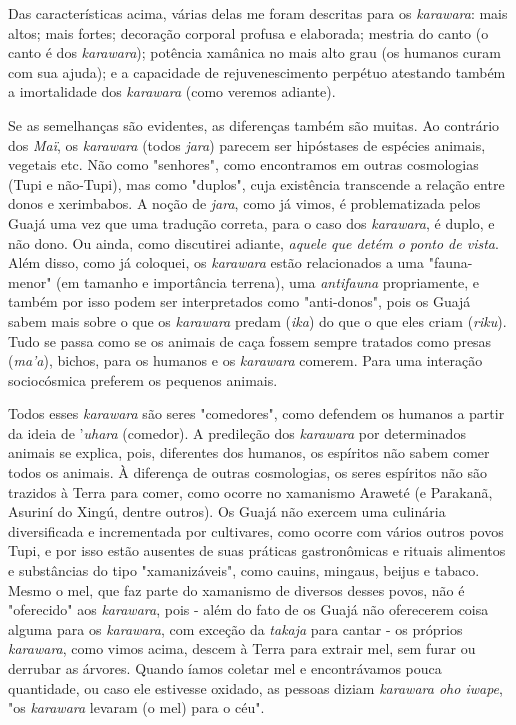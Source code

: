 Das características acima, várias delas me foram descritas para os
\emph{karawara}: mais altos; mais fortes; decoração corporal profusa e
elaborada; mestria do canto (o canto é dos \emph{karawara}); potência
xamânica no mais alto grau (os humanos curam com sua ajuda); e a
capacidade de rejuvenescimento perpétuo atestando também a imortalidade
dos \emph{karawara} (como veremos adiante).

Se as semelhanças são evidentes, as diferenças também são muitas. Ao
contrário dos \emph{Maï}, os \emph{karawara} (todos \emph{jara}) parecem
ser hipóstases de espécies animais, vegetais etc. Não como "senhores",
como encontramos em outras cosmologias (Tupi e não-Tupi), mas como
"duplos", cuja existência transcende a relação entre donos e xerimbabos.
A noção de \emph{jara}, como já vimos, é problematizada pelos Guajá uma
vez que uma tradução correta, para o caso dos \emph{karawara}, é duplo,
e não dono. Ou ainda, como discutirei adiante, \emph{aquele que detém o
ponto de vista}. Além disso, como já coloquei, os \emph{karawara} estão
relacionados a uma "fauna-menor" (em tamanho e importância terrena), uma
\emph{antifauna} propriamente, e também por isso podem ser interpretados
como "anti-donos", pois os Guajá sabem mais sobre o que os
\emph{karawara} predam (\emph{ika}) do que o que eles criam
(\emph{riku}). Tudo se passa como se os animais de caça fossem sempre
tratados como presas (\emph{ma'a}), bichos, para os humanos e os
\emph{karawara} comerem. Para uma interação sociocósmica preferem os
pequenos animais.

Todos esses \emph{karawara} são seres "comedores", como defendem os
humanos a partir da ideia de '\emph{uhara} (comedor). A predileção dos
\emph{karawara} por determinados animais se explica, pois, diferentes
dos humanos, os espíritos não sabem comer todos os animais. À diferença
de outras cosmologias, os seres espíritos não são trazidos à Terra para
comer, como ocorre no xamanismo Araweté (e Parakanã, Asuriní do Xingú,
dentre outros). Os Guajá não exercem uma culinária diversificada e
incrementada por cultivares, como ocorre com vários outros povos Tupi, e
por isso estão ausentes de suas práticas gastronômicas e rituais
alimentos e substâncias do tipo "xamanizáveis", como cauins, mingaus,
beijus e tabaco. Mesmo o mel, que faz parte do xamanismo de diversos
desses povos, não é "oferecido" aos \emph{karawara}, pois - além do fato
de os Guajá não oferecerem coisa alguma para os \emph{karawara}, com
exceção da \emph{takaja} para cantar - os próprios \emph{karawara}, como
vimos acima, descem à Terra para extrair mel, sem furar ou derrubar as
árvores. Quando íamos coletar mel e encontrávamos pouca quantidade, ou
caso ele estivesse oxidado, as pessoas diziam \emph{karawara oho iwape},
"os \emph{karawara} levaram (o mel) para o céu".

